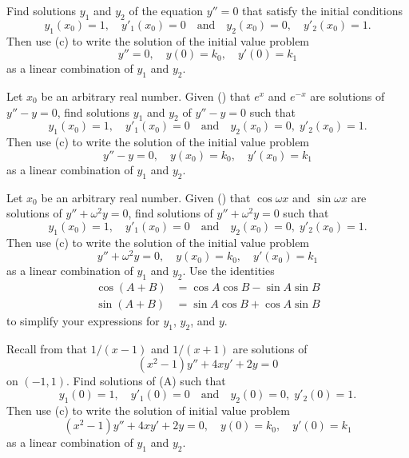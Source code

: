 \begin{exerciselist}
\item\label{exer:5.1.38}Find solutions $y_1$ and $y_2$ of the equation $y''=0$ that satisfy the
initial conditions
\[
y_1(x_0)=1, \quad y'_1(x_0)=0 \quad\text{and}\quad y_2(x_0)=0,
\quad y'_2(x_0)=1.
\]
Then use  (c) to write
the solution of  the initial value problem
\[
y''=0,\quad y(0)=k_0,\quad y'(0)=k_1
\]
as a linear combination of $y_1$ and $y_2$.

\item\label{exer:5.1.39}Let $x_0$ be an arbitrary real number. Given ()
that $e^x$ and $e^{-x}$ are solutions of $y''-y=0$, find
solutions
$y_1$ and $y_2$ of $y''-y=0$ such that
\[
y_1(x_0)=1, \quad y'_1(x_0)=0\quad\text{and}\quad
y_2(x_0)=0,\;  y'_2(x_0)=1.
\]
Then use  (c) to write
the solution of the initial value problem
\[
y''-y=0,\quad y(x_0)=k_0,\quad y'(x_0)=k_1
\]
as a linear combination of $y_1$ and $y_2$.

\item\label{exer:5.1.40}Let $x_0$ be an arbitrary real number. Given ()
that $\cos\omega x$ and $\sin\omega x$ are solutions of
$y''+\omega^2y=0$, find solutions of
 $y''+\omega^2y=0$ such that
\[
y_1(x_0)=1, \quad y'_1(x_0)=0\quad\text{and}\quad
y_2(x_0)=0,\;  y'_2(x_0)=1.
\]
Then use (c) to write
the solution of the initial value problem
\[
y''+\omega^2y=0,\quad y(x_0)=k_0,\quad y'(x_0)=k_1
\]
as a linear combination of $y_1$ and $y_2$.
Use the identities
\begin{align*}
\cos(A+B)&=\cos A\cos B-\sin A\sin B\\
\sin(A+B)&=\sin A\cos B+\cos A\sin B
\end{align*}
to  simplify your expressions for $y_1$, $y_2$, and $y$.

\item\label{exer:5.1.41}Recall from  that
 $1/(x-1)$ and $1/(x+1)$ are solutions of
\[
(x^2-1)y''+4xy'+2y=0
\tag{A}
\]
on $(-1,1)$.
Find solutions of (A)
 such that
\[
y_1(0)=1, \quad y'_1(0)=0\quad\text{and}\quad
y_2(0)=0,\;  y'_2(0)=1.
\]
Then use  (c) to write
the solution of  initial value problem
\[
(x^2-1)y''+4xy'+2y=0,\quad  y(0)=k_0,\quad y'(0)=k_1
\]
as a linear combination of $y_1$ and $y_2$.


\end{exerciselist}
